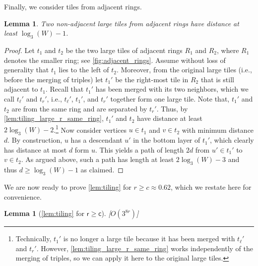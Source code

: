 \documentclass[11pt]{article}
\newtheorem{lemma}[theorem]{Lemma}
\begin{document}
%
Finally, we consider tiles from adjacent rings.
%
\begin{lemma}
    \label{lem:tiling_large_r_adj_rings}
    Two non-adjacent large tiles from adjacent rings have distance at least $\log_3(W) - 1$.
\end{lemma}
\begin{proof}
    Let $t_1$ and $t_2$ be the two large tiles of adjacent rings $R_1$ and $R_2$, where $R_1$ denotes the smaller ring; see \cref{fig:adjacent_rings}.
    Assume without loss of generality that $t_1$ lies to the left of $t_2$.
    Moreover, from the original large tiles (i.e., before the merging of triples) let $t_1'$ be the right-most tile in $R_2$ that is still adjacent to $t_1$.
    Recall that $t_1'$ has been merged with its two neighbors, which we call $t_\ell'$ and $t_r'$, i.e., $t_\ell'$, $t_1'$, and $t_r'$ together form one large tile.
    Note that, $t_1'$ and $t_2$ are from the same ring and are separated by $t_r'$.
    Thus, by \cref{lem:tiling_large_r_same_ring}, $t_1'$ and $t_2$ have distance at least $2\log_3(W) - 2$.\footnote{Technically, $t_1'$ is no longer a large tile because it has been merged with $t_\ell'$ and $t_r'$.
      However, \cref{lem:tiling_large_r_same_ring} works independently of the merging of triples, so we can apply it here to the original large tiles.}
%
    Now consider vertices $u \in t_1$ and $v \in t_2$ with minimum distance $d$.
    By construction, $u$ has a descendant $u'$ in the bottom layer of $t_1'$, which clearly has distance at most $d$ form $u$.
    This yields a path of length $2d$ from $u' \in t_1'$ to $v \in t_2$.
    As argued above, such a path has length at least $2\log_3(W) -3$ and thus $d \ge \log_3(W) - 1$ as claimed.
\end{proof}
%
We are now ready to prove \cref{lem:tiling} for $ r \geq c \approx 0.62 $, which we restate here for convenience.
%
\begin{samepage}
\begin{lemma}[\cref{lem:tiling} for $ \mathsf{r \geq c} $]\label{lem:tiling_large_radius}
    [$ O(3^{8r}) $]
\end{lemma}
\end{samepage}
%
\end{document}
